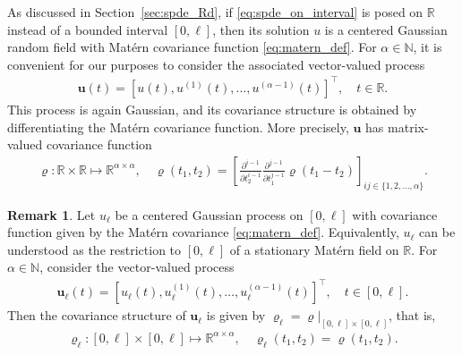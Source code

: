 \documentclass[11pt,a4paper]{article}
\theoremstyle{plain}
\theoremstyle{definition}
\newtheorem{remark}{Remark}
\begin{document}
As discussed in Section~\ref{sec:spde_Rd}, if \eqref{eq:spde_on_interval} is posed on $\mathbb{R}$ instead of a bounded interval $[0,\ell]$, then its solution $u$ is a centered Gaussian random field with Matérn covariance function \eqref{eq:matern_def}. For $\alpha \in \mathbb{N}$, it is convenient for our purposes to consider the associated vector-valued process
\begin{align}
\label{eq:u_vector_value_process_on_R}
    \boldsymbol{u}(t) = [u(t), u^{(1)}(t),\dots, u^{(\alpha-1)}(t)]^\top,\quad t\in\mathbb{R}.
\end{align}
This process is again Gaussian, and its covariance structure is obtained by differentiating the Matérn covariance function. More precisely, $\boldsymbol{u}$ has matrix-valued covariance function \cite{Bolin2023Statistical}
\begin{align}
\label{eq:multivariate_matern_function}
	\boldsymbol{\varrho} : \mathbb{R} \times \mathbb{R} \mapsto \mathbb{R}^{\alpha \times \alpha}, 
	\quad \boldsymbol{\varrho}(t_1,t_2) = \left[ \frac{\partial^{i-1}}{\partial t_2^{i-1}}\frac{\partial^{j-1}}{\partial t_1^{j-1}}\varrho(t_1-t_2)\right]_{ij\in\{1,2,\ldots, \alpha\}}.
\end{align}
\begin{remark}
\label{rem:about_centered_process_on_int}
 Let $u_{\ell}$ be a centered Gaussian process on $[0,\ell]$ with covariance function given by the Matérn covariance \eqref{eq:matern_def}. Equivalently, $u_{\ell}$ can be understood as the restriction to $[0,\ell]$ of a stationary Matérn field on $\mathbb{R}$. For $\alpha \in \mathbb{N}$, consider the vector-valued process
\begin{align}
\label{eq:u_vector_value_process_on_int}
    \boldsymbol{u}_{\ell}(t) = [u_{\ell}(t), u_{\ell}^{(1)}(t), \dots, u_{\ell}^{(\alpha-1)}(t)]^\top, \quad t \in [0,\ell].
\end{align}
Then the covariance structure of $\boldsymbol{u}_{\ell}$ is given by $\boldsymbol{\varrho}_{\ell} = \boldsymbol{\varrho}|_{[0,\ell] \times [0,\ell]}$, that is,
\begin{align}
\label{eq:covariance_matrix_of_process_restricted_to_interval}
	\boldsymbol{\varrho}_{\ell} : [0,\ell] \times [0,\ell] \mapsto \mathbb{R}^{\alpha \times \alpha}, 
	\quad \boldsymbol{\varrho}_{\ell}(t_1,t_2) = \boldsymbol{\varrho}(t_1,t_2). %
\end{align}   
\end{remark}
\end{document}
